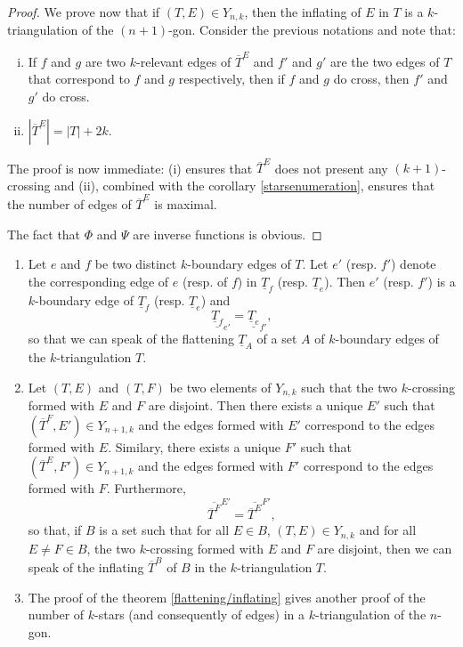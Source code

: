 \documentclass[12pt]{amsart}
\begin{document}
\begin{proof}
\bigskip
We prove now that if $(T,E)\in Y_{n,k}$, then the inflating of $E$ in $T$ is a $k$-triangulation of the $(n+1)$-gon. Consider the previous notations and note that:
\begin{enumerate}[(i)]
\item If $f$ and $g$ are two $k$-relevant edges of $\overline{T}^E$ and $f'$ and $g'$ are the two edges of $T$ that correspond to $f$ and $g$ respectively, then if $f$ and $g$ do cross, then $f'$ and $g'$ do cross.
\item $|\overline{T}^E|=|T|+2k$.
\end{enumerate}

The proof is now immediate: (i) ensures that $\overline{T}^E$ does not present any $(k+1)$-crossing and (ii), combined with the corollary \ref{starsenumeration}, ensures that the number of edges of $\overline{T}^E$ is maximal.

\bigskip
The fact that $\Phi$ and $\Psi$ are inverse functions is obvious.
\end{proof}

\begin{remark}
\begin{enumerate}
\item Let $e$ and $f$ be two distinct $k$-boundary edges of $T$. Let $e'$ (resp. $f'$) denote the corresponding edge of $e$ (resp. of $f$) in $\underline{T}_f$ (resp. $\underline{T}_e$). Then $e'$ (resp. $f'$) is a $k$-boundary edge of $\underline{T}_f$ (resp. $\underline{T}_e$) and
$$\underline{\underline{T}_f}_{e'}=\underline{\underline{T}_e}_{f'},$$
so that we can speak of the flattening $\underline{T}_{A}$ of a set $A$ of $k$-boundary edges of the $k$-triangulation $T$.

\item Let $(T,E)$ and $(T,F)$ be two elements of $Y_{n,k}$ such that the two $k$-crossing formed with $E$ and $F$ are disjoint. Then there exists a unique $E'$ such that $(\overline{T}^F,E')\in Y_{n+1,k}$ and the edges formed with  $E'$ correspond to the edges formed with $E$. Similary, there exists a unique $F'$ such that $(\overline{T}^E,F')\in Y_{n+1,k}$ and the edges formed with  $F'$ correspond to the edges formed with  $F$. Furthermore,
$$\overline{\overline{T}^F}^{E'}=\overline{\overline{T}^E}^{F'},$$
so that, if $B$ is a set such that for all $E\in B$, $(T,E)\in Y_{n,k}$ and for all $E\ne F\in B$, the two $k$-crossing formed with $E$ and $F$ are disjoint, then we can speak of the inflating $\overline{T}^B$ of $B$ in the $k$-triangulation $T$.

\item The proof of the theorem \ref{flattening/inflating} gives another proof of the number of $k$-stars (and consequently of edges) in a $k$-triangulation of the $n$-gon.
\end{enumerate}
\end{remark}
\end{document}
